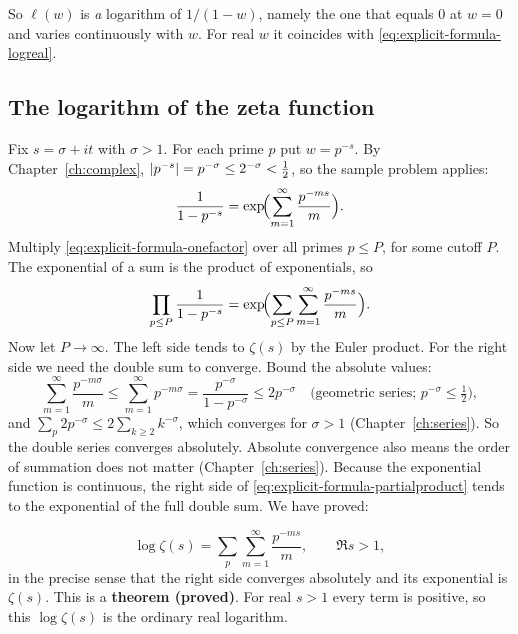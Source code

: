 So $\ell(w)$ is \emph{a} logarithm of $1/(1-w)$, namely the one that equals $0$ at $w=0$ and varies continuously with $w$. For real $w$ it coincides with \cref{eq:explicit-formula-logreal}.

\subsection{The logarithm of the zeta function}

Fix $s=\sigma+it$ with $\sigma>1$. For each prime $p$ put $w=p^{-s}$. By Chapter~\ref{ch:complex}, $\left\lvert p^{-s}\right\rvert=p^{-\sigma}\le 2^{-\sigma}<\tfrac12$, so the sample problem applies:
\begin{equation}
\frac{1}{1-p^{-s}}=\exp\!\Bigl(\sum_{m=1}^{\infty}\frac{p^{-ms}}{m}\Bigr).
\label{eq:explicit-formula-onefactor}
\end{equation}
Multiply \cref{eq:explicit-formula-onefactor} over all primes $p\le P$, for some cutoff $P$. The exponential of a sum is the product of exponentials, so
\begin{equation}
\prod_{p\le P}\frac{1}{1-p^{-s}}=\exp\!\Bigl(\sum_{p\le P}\sum_{m=1}^{\infty}\frac{p^{-ms}}{m}\Bigr).
\label{eq:explicit-formula-partialproduct}
\end{equation}
Now let $P\to\infty$. The left side tends to $\zeta(s)$ by the Euler product. For the right side we need the double sum to converge. Bound the absolute values:
\[
\sum_{m=1}^{\infty}\frac{p^{-m\sigma}}{m}\le\sum_{m=1}^{\infty}p^{-m\sigma}=\frac{p^{-\sigma}}{1-p^{-\sigma}}\le 2p^{-\sigma}\quad\text{(geometric series; }p^{-\sigma}\le\tfrac12\text{)},
\]
and $\sum_p 2p^{-\sigma}\le 2\sum_{k\ge2}k^{-\sigma}$, which converges for $\sigma>1$ (Chapter~\ref{ch:series}). So the double series converges absolutely. Absolute convergence also means the order of summation does not matter (Chapter~\ref{ch:series}). Because the exponential function is continuous, the right side of \cref{eq:explicit-formula-partialproduct} tends to the exponential of the full double sum. We have proved:

\begin{equation}
\boxed{\log\zeta(s)=\sum_{p}\sum_{m=1}^{\infty}\frac{p^{-ms}}{m},\qquad \Re s>1,}
\label{eq:explicit-formula-logzeta}
\end{equation}
in the precise sense that the right side converges absolutely and its exponential is $\zeta(s)$. This is a \textbf{theorem (proved)}. For real $s>1$ every term is positive, so this $\log\zeta(s)$ is the ordinary real logarithm.


